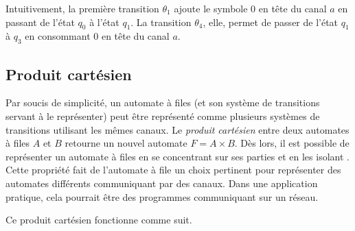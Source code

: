 \begin{example}
  Intuitivement, la première transition $\theta_1$ ajoute le symbole $0$ en tête du canal $a$ en passant de l'état $q_0$ à l'état $q_1$. La transition $\theta_4$, elle, permet de passer de l'état $q_1$ à $q_3$ en consommant $0$ en tête du canal $a$.

\end{example}



\subsection{Produit cartésien}\label{ss:cartesien}

Par soucis de simplicité, un automate à files (et son système de transitions servant à le représenter) peut être représenté comme plusieurs systèmes de transitions utilisant les mêmes canaux. Le \emph{produit cartésien} entre deux automates à files $A$ et $B$ retourne un nouvel automate $F=A \times B$. Dès lors, il est possible de représenter un automate à files en se concentrant sur ses parties et en les isolant \cite{Suresh20}. Cette propriété fait de l'automate à file un choix pertinent pour représenter des automates différents communiquant par des canaux. Dans une application pratique, cela pourrait être des programmes communiquant sur un réseau.

Ce produit cartésien fonctionne comme suit.

